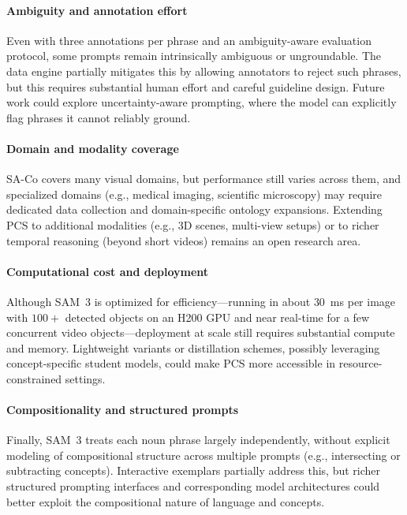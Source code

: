\begin{enrichment}
\begin{enrichment}
		\paragraph{Ambiguity and annotation effort}
		
		Even with three annotations per phrase and an ambiguity-aware evaluation protocol, some prompts remain intrinsically ambiguous or ungroundable. The data engine partially mitigates this by allowing annotators to reject such phrases, but this requires substantial human effort and careful guideline design. Future work could explore uncertainty-aware prompting, where the model can explicitly flag phrases it cannot reliably ground.
		
		\paragraph{Domain and modality coverage}
		
		SA-Co covers many visual domains, but performance still varies across them, and specialized domains (e.g., medical imaging, scientific microscopy) may require dedicated data collection and domain-specific ontology expansions. Extending PCS to additional modalities (e.g., 3D scenes, multi-view setups) or to richer temporal reasoning (beyond short videos) remains an open research area.
		
		\paragraph{Computational cost and deployment}
		
		Although SAM~3 is optimized for efficiency---running in about $30$~ms per image with $100+$ detected objects on an H200 GPU and near real-time for a few concurrent video objects---deployment at scale still requires substantial compute and memory. Lightweight variants or distillation schemes, possibly leveraging concept-specific student models, could make PCS more accessible in resource-constrained settings.
		
		\paragraph{Compositionality and structured prompts}
		
		Finally, SAM~3 treats each noun phrase largely independently, without explicit modeling of compositional structure across multiple prompts (e.g., intersecting or subtracting concepts). Interactive exemplars partially address this, but richer structured prompting interfaces and corresponding model architectures could better exploit the compositional nature of language and concepts.
		
	\end{enrichment}

\end{enrichment}

